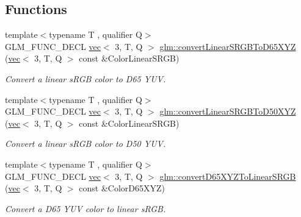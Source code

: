 \subsection*{Functions}
\begin{DoxyCompactItemize}
\item 
\mbox{\label{group__gtx__color__encoding_gaf9e130d9d4ccf51cc99317de7449f369}} 
{\footnotesize template$<$typename T , qualifier Q$>$ }\\G\+L\+M\+\_\+\+F\+U\+N\+C\+\_\+\+D\+E\+CL \hyperlink{structglm_1_1vec}{vec}$<$ 3, T, Q $>$ \hyperlink{group__gtx__color__encoding_gaf9e130d9d4ccf51cc99317de7449f369}{glm\+::convert\+Linear\+S\+R\+G\+B\+To\+D65\+X\+YZ} (\hyperlink{structglm_1_1vec}{vec}$<$ 3, T, Q $>$ const \&Color\+Linear\+S\+R\+GB)
\begin{DoxyCompactList}\small\item\em Convert a linear s\+R\+GB color to D65 Y\+UV. \end{DoxyCompactList}\item 
\mbox{\label{group__gtx__color__encoding_ga1522ba180e3d83d554a734056da031f9}} 
{\footnotesize template$<$typename T , qualifier Q$>$ }\\G\+L\+M\+\_\+\+F\+U\+N\+C\+\_\+\+D\+E\+CL \hyperlink{structglm_1_1vec}{vec}$<$ 3, T, Q $>$ \hyperlink{group__gtx__color__encoding_ga1522ba180e3d83d554a734056da031f9}{glm\+::convert\+Linear\+S\+R\+G\+B\+To\+D50\+X\+YZ} (\hyperlink{structglm_1_1vec}{vec}$<$ 3, T, Q $>$ const \&Color\+Linear\+S\+R\+GB)
\begin{DoxyCompactList}\small\item\em Convert a linear s\+R\+GB color to D50 Y\+UV. \end{DoxyCompactList}\item 
\mbox{\label{group__gtx__color__encoding_ga5265386fc3ac29e4c580d37ed470859c}} 
{\footnotesize template$<$typename T , qualifier Q$>$ }\\G\+L\+M\+\_\+\+F\+U\+N\+C\+\_\+\+D\+E\+CL \hyperlink{structglm_1_1vec}{vec}$<$ 3, T, Q $>$ \hyperlink{group__gtx__color__encoding_ga5265386fc3ac29e4c580d37ed470859c}{glm\+::convert\+D65\+X\+Y\+Z\+To\+Linear\+S\+R\+GB} (\hyperlink{structglm_1_1vec}{vec}$<$ 3, T, Q $>$ const \&Color\+D65\+X\+YZ)
\begin{DoxyCompactList}\small\item\em Convert a D65 Y\+UV color to linear s\+R\+GB. \end{DoxyCompactList}\item 

\end{DoxyCompactItemize}
